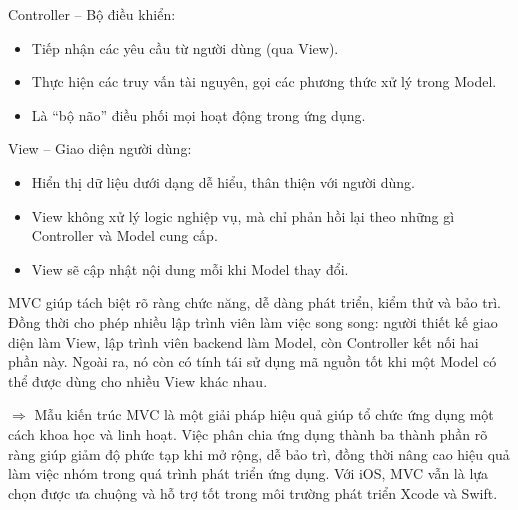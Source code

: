     \begin{flushleft}
      \hspace*{0.8cm}Controller – Bộ điều khiển:
      \setlength{\leftmargini}{1.5cm}
      \begin{itemize}
          \item Tiếp nhận các yêu cầu từ người dùng (qua View).
          \item Thực hiện các truy vấn tài nguyên, gọi các phương thức xử lý trong Model.
          \item Là “bộ não” điều phối mọi hoạt động trong ứng dụng.
      \end{itemize}
    \end{flushleft}

    \begin{flushleft}
      \hspace*{0.8cm}View – Giao diện người dùng:
      \setlength{\leftmargini}{1.5cm}
      \begin{itemize}
          \item Hiển thị dữ liệu dưới dạng dễ hiểu, thân thiện với người dùng.
          \item View không xử lý logic nghiệp vụ, mà chỉ phản hồi lại theo những gì Controller và Model cung cấp.
          \item View sẽ cập nhật nội dung mỗi khi Model thay đổi.
      \end{itemize}
    \end{flushleft}

    \begin{flushleft}
      \hspace*{0.8cm}MVC giúp tách biệt rõ ràng chức năng, dễ dàng phát triển, kiểm thử và bảo trì. Đồng thời cho phép nhiều lập trình viên làm việc song song: người thiết kế giao diện làm View, lập trình viên backend làm Model, còn Controller kết nối hai phần này. Ngoài ra, nó còn có tính tái sử dụng mã nguồn tốt khi một Model có thể được dùng cho nhiều View khác nhau.
    \end{flushleft}

    \begin{flushleft}
      \hspace*{0.8cm}$\Rightarrow$ Mẫu kiến trúc MVC là một giải pháp hiệu quả giúp tổ chức ứng dụng một cách khoa học và linh hoạt. Việc phân chia ứng dụng thành ba thành phần rõ ràng giúp giảm độ phức tạp khi mở rộng, dễ bảo trì, đồng thời nâng cao hiệu quả làm việc nhóm trong quá trình phát triển ứng dụng. Với iOS, MVC vẫn là lựa chọn được ưa chuộng và hỗ trợ tốt trong môi trường phát triển Xcode và Swift.
    \end{flushleft}

